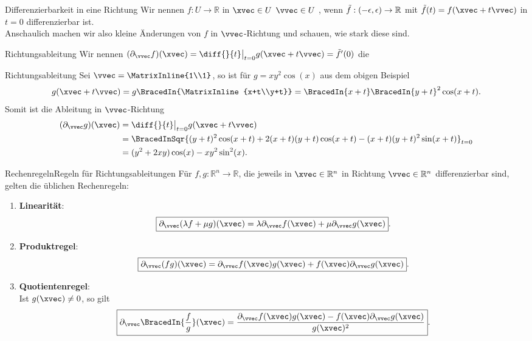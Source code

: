 \begin{Def}
{Differenzierbarkeit in eine Richtung}
Wir nennen $f:U\to\mathbb{R}$ in $\xvec\in U$  $\vvec\in U$ , wenn $\Tilde{f}:(-\epsilon,\epsilon)\to\mathbb{R}$ mit $\Tilde{f}(t)=f(\xvec+t\vvec)$ in $t=0$ differenzierbar ist.\\
Anschaulich machen wir also kleine Änderungen von $f$ in $\vvec$-Richtung und schauen, wie stark diese sind.
\end{Def}
\begin{Def}
{Richtungsableitung}
Wir nennen $(\partial_\vvec f)(\xvec)=\diff{}{t}\big|_{t=0}g(\xvec+t\vvec)=\Tilde{f}'(0)$ die 
\end{Def}
\begin{Beispiel}
{Richtungsableitung}
Sei $\vvec=\MatrixInline{1\\1}$, so ist für $g=xy^2\cos(x)$ aus dem obigen Beispiel
\begin{equation*}
    g(\xvec+t\vvec)=g\BracedIn{\MatrixInline{x+t\\y+t}}=\BracedIn{x+t}\BracedIn{y+t}^2\cos(x+t).
\end{equation*}
Somit ist die Ableitung in $\vvec$-Richtung
\begin{align*}
    (\partial_\vvec g)(\xvec)&=\diff{}{t}\big|_{t=0}g(\xvec+t\vvec)\\
    &=\BracedInSqr{(y+t)^2\cos(x+t)+2(x+t)(y+t)\cos(x+t)-(x+t)(y+t)^2\sin(x+t)}_{t=0}\\
    &=(y^2+2xy)\cos(x)-xy^2\sin^2(x).
\end{align*}
\end{Beispiel}
\begin{Satz}
{Rechenregeln}{Regeln für Richtungsableitungen}
Für $f,g:\mathbb{R}^n\to\mathbb{R}$, die jeweils in $\xvec\in\mathbb{R}^n$ in Richtung $\vvec\in\mathbb{R}^n$ differenzierbar sind, gelten die üblichen Rechenregeln:
\begin{enumerate}
    \item \textbf{Linearität}:
    \begin{equation*}
        \boxed{\partial_\vvec(\lambda f+\mu g)(\xvec)=\lambda \partial_\vvec f(\xvec)+\mu\partial_\vvec  g(\xvec)}.
    \end{equation*}
    \item \textbf{Produktregel}:
    \begin{equation*}
        \boxed{\partial_\vvec (fg)(\xvec)=\partial_\vvec f(\xvec)g(\xvec)+f(\xvec)\partial_\vvec g(\xvec)}.
    \end{equation*}
    \item \textbf{Quotientenregel}:\\
    Ist $g(\xvec)\neq 0$, so gilt
    \begin{equation*}
        \boxed{\partial_\vvec \BracedIn{\frac{f}{g}}(\xvec)=\frac{\partial_\vvec f(\xvec)g(\xvec)-f(\xvec)\partial_\vvec g(\xvec)}{g(\xvec)^2}}.
    \end{equation*}
\end{enumerate}
\end{Satz}
